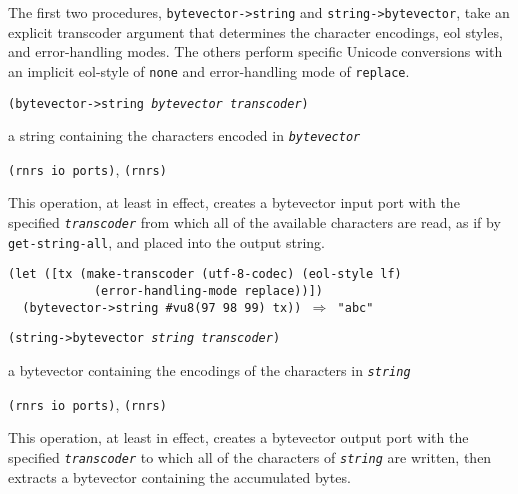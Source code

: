The first two procedures, \texttt{bytevector-\textgreater{}string} and
\texttt{string-\textgreater{}bytevector}, take an explicit transcoder argument that
determines the character encodings, eol styles, and error-handling modes.
The others perform specific Unicode conversions with an implicit
eol-style of \texttt{none} and error-handling mode of \texttt{replace}.


\begin{description}

\label{io_s91}\item[procedure] \texttt{(bytevector-\textgreater{}string \textit{bytevector} \textit{transcoder})}



\item[returns] a string containing the characters encoded in \texttt{\textit{bytevector}}


\item[libraries] \texttt{(rnrs io ports)}, \texttt{(rnrs)}
\end{description}


This operation, at least in effect, creates a bytevector input port with
the specified \texttt{\textit{transcoder}} from which all of the available characters
are read, as if by \texttt{get-string-all}, and placed into the output
string.


\begin{alltt}
(let ([tx (make-transcoder (utf-8-codec) (eol-style lf)
            (error-handling-mode replace))])
  (bytevector-\textgreater{}string \#{}vu8(97 98 99) tx)) \(\Rightarrow\) "abc"
\end{alltt}

\begin{description}

\label{io_s92}\item[procedure] \texttt{(string-\textgreater{}bytevector \textit{string} \textit{transcoder})}



\item[returns] a bytevector containing the encodings of the characters in \texttt{\textit{string}}


\item[libraries] \texttt{(rnrs io ports)}, \texttt{(rnrs)}
\end{description}


This operation, at least in effect, creates a bytevector output port with
the specified \texttt{\textit{transcoder}} to which all of the characters of
\texttt{\textit{string}} are written, then extracts a bytevector containing the
accumulated bytes.


